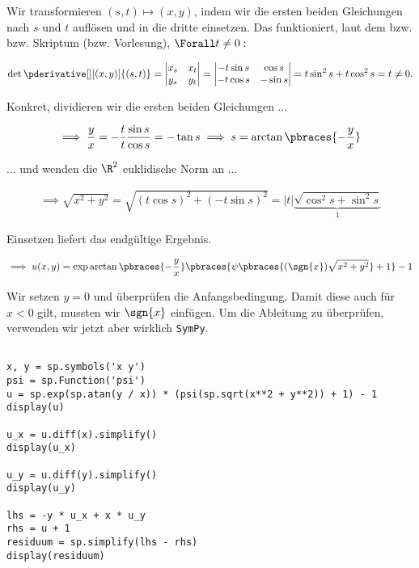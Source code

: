 \begin{solution}
Wir transformieren $(s, t) \mapsto (x, y)$, indem wir die ersten beiden Gleichungen nach $s$ und $t$ auflösen und in die dritte einsetzen.
Das funktioniert, laut dem  bzw.  bzw. Skriptum (bzw. Vorlesung), $\Forall t \neq 0:$

\begin{align*}
    \det \pderivative[][(x, y)]{(s, t)}
    =
    \begin{vmatrix}
        x_s & x_t \\
        y_s & y_t
    \end{vmatrix}
    =
    \begin{vmatrix}
        -t \sin{s} &  \cos{s} \\
        -t \cos{s} & -\sin{s}
    \end{vmatrix}
    =
    t \sin^2{s} + t \cos^2{s}
    =
    t \neq 0.
\end{align*}

Konkret, dividieren wir die ersten beiden Gleichungen ...

\begin{align*}
    \implies
    \frac{y}{x}
    =
    -\frac{t}{t} \frac{\sin{s}}{\cos{s}}
    =
    -\tan{s}
    \implies
    s = \arctan
    {
        \pbraces{-\frac{y}{x}}
    }
\end{align*}

... und wenden die $\R^2$ euklidische Norm an ...

\begin{align*}
    \implies
    \sqrt{x^2 + y ^2}
    =
    \sqrt
    {
        (t \cos{s})^2
        +
        (-t \sin{s})^2
    }
    =
    |t|
    \underbrace
    {
        \sqrt
        {
            \cos^2{s}
            +
            \sin^2{s}
        }
    }_1
\end{align*}

Einsetzen liefert das endgültige Ergebnis.

\begin{align*}
    \implies
    u(x, y)
    =
    \exp \arctan \pbraces
    {
        -\frac{y}{x}
    }
    \pbraces
    {
        \psi \pbraces
        {
            (\sgn{x})
            \sqrt{x^2 + y^2}
        } + 1
    } - 1
\end{align*}

Wir setzen $y = 0$ und überprüfen die Anfangsbedingung.
Damit diese auch für $x < 0$ gilt, mussten wir $\sgn{x}$ einfügen.
Um die Ableitung zu überprüfen, verwenden wir jetzt aber wirklich \verb|SymPy|.

\begin{lstlisting}
    
x, y = sp.symbols('x y')
psi = sp.Function('psi')
u = sp.exp(sp.atan(y / x)) * (psi(sp.sqrt(x**2 + y**2)) + 1) - 1
display(u)

u_x = u.diff(x).simplify()
display(u_x)

u_y = u.diff(y).simplify()
display(u_y)

lhs = -y * u_x + x * u_y
rhs = u + 1
residuum = sp.simplify(lhs - rhs)
display(residuum)

\end{lstlisting}

\end{solution}

